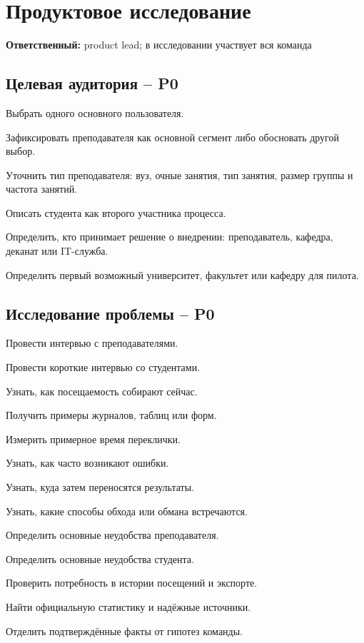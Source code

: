 \documentclass[11pt,a4paper]{article}
\newcommand{\PZero}{\textcolor{PZero}{\textbf{P0}}}
\newcommand{\owner}[1]{\textcolor{Muted}{\textbf{Ответственный:} #1}}
\begin{document}
\section{Продуктовое исследование}
\owner{product lead; в исследовании участвует вся команда}

\subsection{Целевая аудитория -- \PZero}
\begin{tasklist}
  \item Выбрать одного основного пользователя.
  \item Зафиксировать преподавателя как основной сегмент либо обосновать другой выбор.
  \item Уточнить тип преподавателя: вуз, очные занятия, тип занятия, размер группы и частота занятий.
  \item Описать студента как второго участника процесса.
  \item Определить, кто принимает решение о внедрении: преподаватель, кафедра, деканат или IT-служба.
  \item Определить первый возможный университет, факультет или кафедру для пилота.
\end{tasklist}

\subsection{Исследование проблемы -- \PZero}
\begin{tasklist}
  \item Провести интервью с преподавателями.
  \item Провести короткие интервью со студентами.
  \item Узнать, как посещаемость собирают сейчас.
  \item Получить примеры журналов, таблиц или форм.
  \item Измерить примерное время переклички.
  \item Узнать, как часто возникают ошибки.
  \item Узнать, куда затем переносятся результаты.
  \item Узнать, какие способы обхода или обмана встречаются.
  \item Определить основные неудобства преподавателя.
  \item Определить основные неудобства студента.
  \item Проверить потребность в истории посещений и экспорте.
  \item Найти официальную статистику и надёжные источники.
  \item Отделить подтверждённые факты от гипотез команды.
\end{tasklist}
\end{document}
